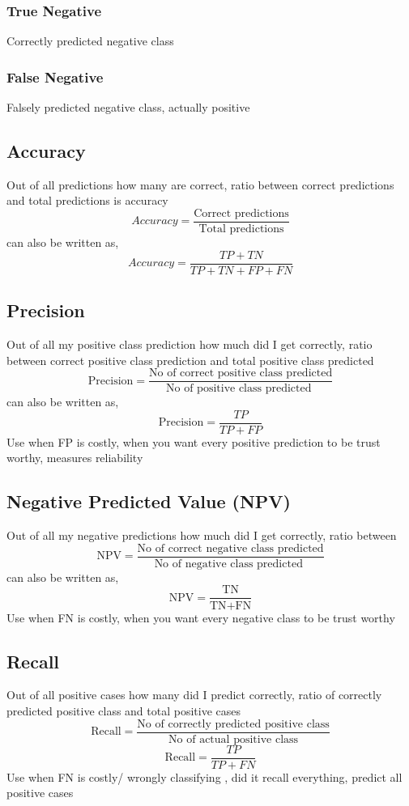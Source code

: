 \documentclass[12pt]{extarticle}
\begin{document}
\subsubsection*{True Negative}
Correctly predicted negative class

\subsubsection*{False Negative}
Falsely predicted negative class, actually positive 

\subsection{Accuracy}
Out of all predictions how many are correct, 
ratio between correct predictions and total predictions is accuracy
$$ Accuracy = \frac{\text{Correct predictions}} {\text{Total predictions}} $$
can also be written as,
$$ Accuracy = \frac{TP+TN}{TP+TN+FP+FN}  $$

\subsection{Precision}
Out of all my positive class prediction how much did I get correctly, 
ratio between correct positive class prediction and total positive class predicted
$$ \text{Precision} = \frac{\text{No of correct positive class predicted}}{\text{No of positive class predicted }} $$
can also be written as,
$$\text{Precision} = \frac{TP}{TP+FP}$$
Use when FP is costly, when you want every positive prediction to be trust worthy, measures reliability

\subsection{Negative Predicted Value (NPV)}
Out of all my negative predictions how much did I get correctly, 
ratio between
$$ \text{NPV} = \frac{\text{No of correct negative class predicted}}{\text{No of negative class predicted }} $$
can also be written as,
$$\text{NPV} = \frac{\text{TN}}{\text{TN} + \text{FN}}$$
Use when FN is costly, when you want every negative class to be trust worthy

\subsection{Recall}
Out of all positive cases how many did I predict correctly, 
ratio of correctly predicted positive class and total positive cases
$$ \text{Recall} = \frac{\text{No of correctly predicted positive class}}{\text{No of actual positive class}}  $$
$$ \text{Recall} = \frac{TP}{TP+FN}$$
Use when FN is costly/ wrongly classifying , did it recall everything, predict all positive cases
\end{document}
